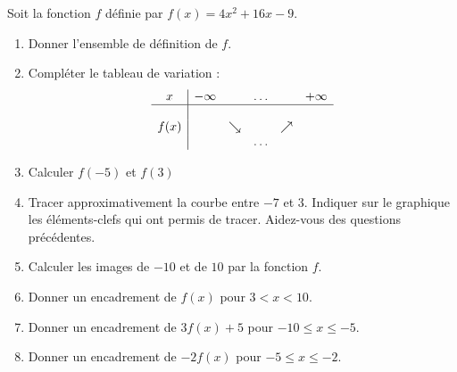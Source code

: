 
\begin{exercice}\label{exosmath-0220}

Soit la fonction \( f\) définie par \( f(x)=4x^2+16x-9\).
\begin{enumerate}
    \item
        Donner l'ensemble de définition de \( f\).
    \item
        Compléter le tableau de variation :
        \begin{equation*}
            \begin{array}[]{c|ccccc}
                x&-\infty&&\ldots&&+\infty\\
                \hline
                &&&&&\\
                f(x)&&\searrow&&\nearrow&\\
                &&&\ldots&&\\
            \end{array}
        \end{equation*}
    \item
        Calculer \( f(-5)\) et \( f(3)\)
    \item
        Tracer approximativement la courbe entre \( -7\) et \( 3\). Indiquer sur le graphique les éléments-clefs qui ont permis de tracer. Aidez-vous des questions précédentes.
    \item
        Calculer les images de \( -10\) et de \( 10\) par la fonction \( f\).
    \item
        Donner un encadrement de \( f(x)\) pour \( 3<x<10\).
    \item
        Donner un encadrement de \( 3f(x)+5\) pour \( -10\leq x\leq -5\).
    \item
        Donner un encadrement de \( -2f(x)\) pour \( -5\leq x\leq -2\).
        
\end{enumerate}

\end{exercice}
